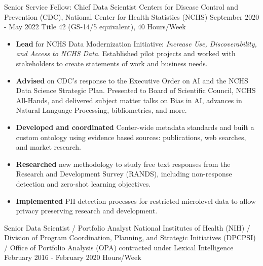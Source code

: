 \documentclass[]{scrartcl}
\begin{document}
\begin{cleanCV}
{\begin{itemize}
  \end{itemize}
}

\vspace{1em}

    
  \WorkExperience
{}
{Senior Service Fellow: Chief Data Scientist}
{
  \newline Centers for Disease Control and Prevention (CDC), National Center for
Health Statistics (NCHS)
  \newline September 2020 - May 2022
  \newline Title 42 (GS-14/5 equivalent), 40 Hours/Week
}
{
  \vspace{-0.25em}
  \begin{itemize}

   \item \textbf{Lead} for NCHS Data Modernization Initiative: \emph{Increase Use, Discoverability, and Access to NCHS Data}. Established pilot projects and worked with stakeholders to create statements of work and business needs.
   \item \textbf{Advised} on CDC's response to the Executive Order on AI and the NCHS Data Science Strategic Plan. Presented to Board of Scientific Council, NCHS All-Hands, and delivered subject matter talks on Bias in AI, advances in Natural Language Processing, bibliometrics, and more.
   \item \textbf{Developed and coordinated} Center-wide metadata standards and built a custom ontology using evidence based sources: publications, web searches, and market research.
   \item \textbf{Researched} new methodology to study free text responses from the Research and Development Survey (RANDS), including non-response detection and zero-shot learning objectives.
   \item \textbf{Implemented} PII detection processes for restricted microlevel data to allow privacy preserving research and development.
  \end{itemize}
}
  
  \WorkExperience
{}
{Senior Data Scientist / Portfolio Analyst}
{
  \newline National Institutes of Health (NIH) / Division of Program Coordination, Planning, and Strategic Initiatives (DPCPSI) / Office of Portfolio Analysis (OPA) contracted under Lexical Intelligence
  \newline February 2016 - February 2020
   Hours/Week
}
{
  \vspace{-0.25em}
  \begin{itemize}
    

\end{itemize}}
\end{cleanCV}
\end{document}
